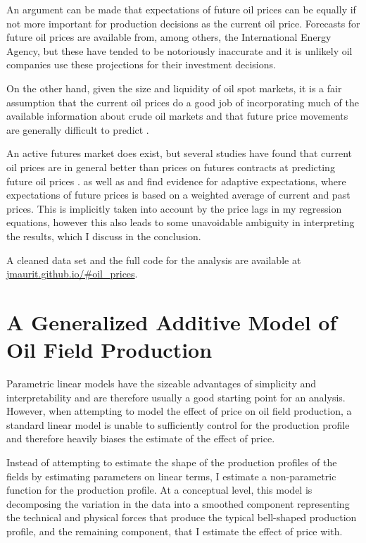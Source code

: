 \documentclass[12pt]{article}
\begin{document}
An argument can be made that expectations of future oil prices can be equally if not more important for production decisions as the current oil price.  Forecasts for future oil prices are available from, among others, the International Energy Agency, but these have tended to be notoriously inaccurate and it is unlikely oil companies use these projections for their investment decisions.

On the other hand, given the size and liquidity of oil spot markets, it is a fair assumption that the current oil prices do a good job of incorporating much of the available information about crude oil markets and that future price movements are generally difficult to predict \citep{hamilton_understanding_2008}.

An active futures market does exist, but several studies have found that current oil prices are in general better than prices on futures contracts at predicting future oil prices \citep{alquist_what_2010, chinn_predictive_2005}.  \citet{mohn_investment_2008} as well as \citet{pesaran_econometric_1990} and \citet{farzin_impact_2001} find evidence for adaptive expectations, where expectations of future prices is based on a weighted average of current and past prices. This is implicitly taken into account by the price lags in my regression equations, however this also leads to some unavoidable ambiguity in interpreting the results, which I discuss in the conclusion. 

A cleaned data set and the full code for the analysis are available at \url{jmaurit.github.io/#oil_prices}.

\section{A Generalized Additive Model of Oil Field Production}
Parametric linear models have the sizeable advantages of simplicity and interpretability and are therefore usually a good starting point for an analysis. However, when attempting to model the effect of price on oil field production, a standard linear model is unable to sufficiently control for the production profile and therefore heavily biases the estimate of the effect of price.
  
Instead of attempting to estimate the shape of the production profiles of the fields by estimating parameters on linear terms, I estimate a non-parametric function for the production profile. At a conceptual level, this model is decomposing the variation in the data into a smoothed component representing the technical and physical forces that produce the typical bell-shaped production profile, and the remaining component, that I estimate the effect of price with.  
\end{document}

